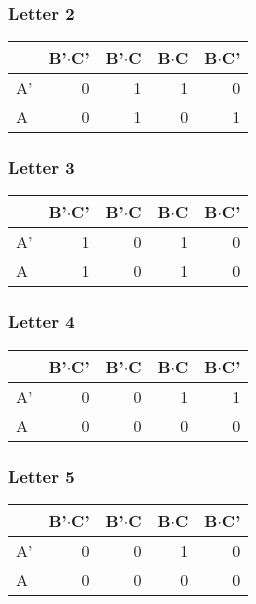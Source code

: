 \documentclass[11pt]{article}
\begin{document}
\subsubsection{Letter 2}
\label{sec-2-0-3}
\begin{center}
\begin{tabular}{lrrrr}
 & B'$\cdot$C' & B'$\cdot$C & B$\cdot$C & B$\cdot$C'\\
\hline
A' & 0 & 1 & 1 & 0\\
A & 0 & 1 & 0 & 1\\
\end{tabular}
\end{center}
\subsubsection{Letter 3}
\label{sec-2-0-4}
\begin{center}
\begin{tabular}{lrrrr}
 & B'$\cdot$C' & B'$\cdot$C & B$\cdot$C & B$\cdot$C'\\
\hline
A' & 1 & 0 & 1 & 0\\
A & 1 & 0 & 1 & 0\\
\end{tabular}
\end{center}
\subsubsection{Letter 4}
\label{sec-2-0-5}
\begin{center}
\begin{tabular}{lrrrr}
 & B'$\cdot$C' & B'$\cdot$C & B$\cdot$C & B$\cdot$C'\\
\hline
A' & 0 & 0 & 1 & 1\\
A & 0 & 0 & 0 & 0\\
\end{tabular}
\end{center}
\subsubsection{Letter 5}
\label{sec-2-0-6}
\begin{center}
\begin{tabular}{lrrrr}
 & B'$\cdot$C' & B'$\cdot$C & B$\cdot$C & B$\cdot$C'\\
\hline
A' & 0 & 0 & 1 & 0\\
A & 0 & 0 & 0 & 0\\
\end{tabular}
\end{center}
\end{document}
